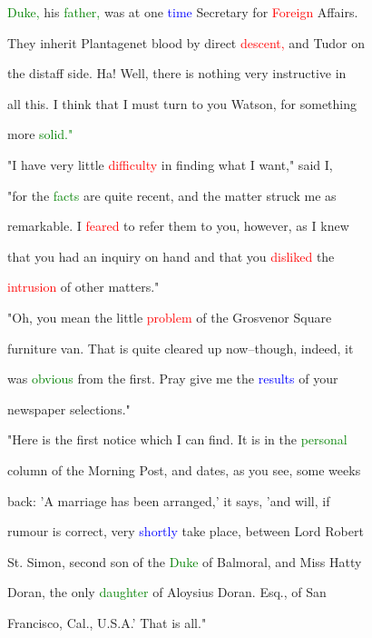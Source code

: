  \textcolor{green}{Duke,} his \textcolor{green}{father,} was at one \textcolor{blue}{time} Secretary for \textcolor{red}{Foreign} Affairs.

 They inherit Plantagenet blood by direct \textcolor{red}{descent,} and Tudor on

 the distaff side. Ha! Well, there is nothing very instructive in

 all this. I think that I must turn to you Watson, for something

 more \textcolor{green}{solid."}



 "I have very little \textcolor{red}{difficulty} in finding what I want," said I,

 "for the \textcolor{green}{facts} are quite recent, and the matter struck me as

 \textcolor{BurntOrange}{remarkable.} I \textcolor{red}{feared} to refer them to you, however, as I knew

 that you had an \textcolor{BurntOrange}{inquiry} on hand and that you \textcolor{red}{disliked} the

 \textcolor{red}{intrusion} of other matters."



 "Oh, you mean the little \textcolor{red}{problem} of the Grosvenor Square

 furniture van. That is quite cleared up now--though, indeed, it

 was \textcolor{green}{obvious} from the first. \textcolor{BurntOrange}{Pray} give me the \textcolor{blue}{results} of your

 newspaper selections."



 "Here is the first notice which I can find. It is in the \textcolor{green}{personal}

 column of the Morning Post, and dates, as you see, some weeks

 back: 'A \textcolor{BurntOrange}{marriage} has been arranged,' it says, 'and will, if

 rumour is correct, very \textcolor{blue}{shortly} take place, between \textcolor{BurntOrange}{Lord} Robert

 St. Simon, second son of the \textcolor{green}{Duke} of Balmoral, and Miss Hatty

 Doran, the only \textcolor{green}{daughter} of Aloysius Doran. Esq., of San

 Francisco, Cal., U.S.A.' That is all."




